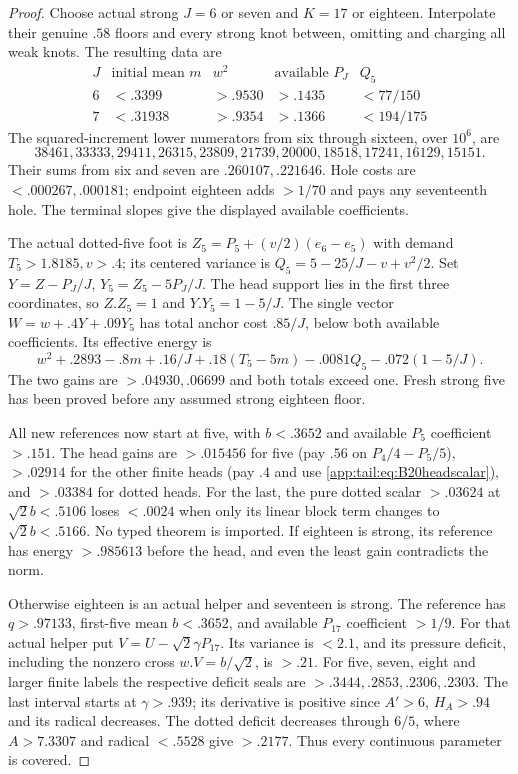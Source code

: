 \begin{proof}
Choose actual strong $J=6$ or seven and $K=17$ or eighteen.
Interpolate their genuine $.58$ floors and every strong knot
between, omitting and charging all weak knots. The resulting data are
\[
\begin{array}{c|c|c|c|c}
J&\text{initial mean }m&w^2&\text{available }P_J&Q_5\\\hline
6&<.3399&>.9530&>.1435&<77/150\\
7&<.31938&>.9354&>.1366&<194/175
\end{array}
\]
The squared-increment lower numerators from six through sixteen,
over $10^6$, are
\[
38461,33333,29411,26315,23809,21739,20000,18518,17241,16129,15151.
\]
Their sums from six and seven are $.260107,.221646$.
Hole costs are $<.000267,.000181$; endpoint eighteen adds
$>1/70$ and pays any seventeenth hole. The terminal slopes give
the displayed available coefficients.

The actual dotted-five foot is
$Z_5=P_5+(v/2)(e_6-e_5)$ with demand $T_5>1.8185,v>.4$;
its centered variance is $Q_5=5-25/J-v+v^2/2$.
Set $Y=Z-P_J/J$, $Y_5=Z_5-5P_J/J$.
The head support lies in the first three coordinates, so
$Z.Z_5=1$ and $Y.Y_5=1-5/J$.
The single vector $W=w+.4Y+.09Y_5$ has total anchor cost
$.85/J$, below both available coefficients. Its effective energy is
\[
 w^2+.2893-.8m+.16/J+.18(T_5-5m)
                     -.0081Q_5-.072(1-5/J).
\]
The two gains are $>.04930,.06699$ and both totals exceed one.
Fresh strong five has been proved before any assumed strong
eighteen floor.

All new references now start at five, with $b<.3652$ and
available $P_5$ coefficient $>.151$.
The head gains are $>.015456$ for five (pay $.56$ on
$P_4/4-P_5/5$), $>.02914$ for the other finite heads
(pay $.4$ and use \eqref{app:tail:eq:B20headscalar}), and
$>.03384$ for dotted heads. For the last, the pure dotted
scalar $>.03624$ at $\sqrt2b<.5106$ loses $<.0024$ when
only its linear block term changes to $\sqrt2b<.5166$.
No typed theorem is imported.
If eighteen is strong, its reference has energy $>.985613$
before the head, and even the least gain contradicts the norm.

Otherwise eighteen is an actual helper and seventeen is strong.
The reference has $q>.97133$, first-five mean $b<.3652$,
and available $P_{17}$ coefficient $>1/9$.
For that actual helper put $V=U-\sqrt2\gamma P_{17}$.
Its variance is $<2.1$, and its pressure deficit, including
the nonzero cross $w.V=b/\sqrt2$, is $>.21$.
For five, seven, eight and larger finite labels the respective
deficit seals are $>.3444,.2853,.2306,.2303$.
The last interval starts at $\gamma>.939$; its derivative is
positive since $A'>6$, $H_A>.94$ and its radical decreases.
The dotted deficit decreases through $6/5$, where
$A>7.3307$ and radical $<.5528$ give $>.2177$.
Thus every continuous parameter is covered.


\end{proof}
